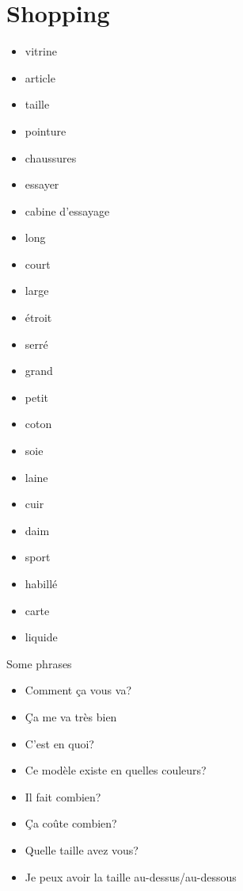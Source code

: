 \documentclass{epflnotes}
\begin{document}
\section{Shopping}

\begin{multicols}{3}
\begin{itemize}
\item vitrine
\item article
\item taille
\item pointure
\item chaussures
\item essayer
\item cabine d'essayage
\item long
\item court
\item large
\item étroit
\item serré
\item grand
\item petit
\item coton
\item soie
\item laine
\item cuir
\item daim
\item sport
\item habillé
\item carte
\item liquide
\end{itemize}
\end{multicols}

Some phrases

\begin{multicols}{2}
\begin{itemize}
\item Comment ça vous va?
\item Ça me va très bien
\item C'est en quoi?
\item Ce modèle existe en quelles couleurs?
\item Il fait combien?
\item Ça co\^ute combien?
\item Quelle taille avez vous?
\item Je peux avoir la taille au-dessus/au-dessous
\end{itemize}
\end{multicols}
\end{document}
